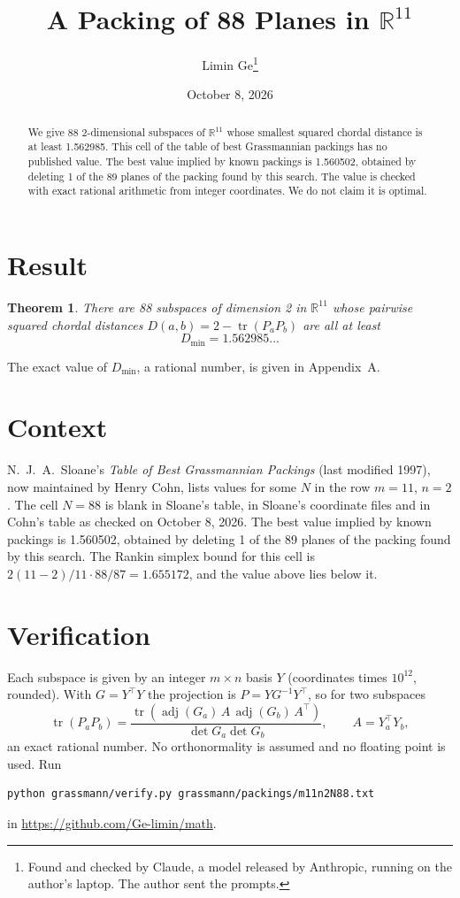\documentclass[11pt,a4paper]{article}
\title{A Packing of 88 Planes in $\mathbb{R}^{11}$}
\author{Limin Ge\thanks{Found and checked by Claude, a model released by Anthropic, running on the author's laptop. The author sent the prompts.}}
\date{October 8, 2026}
\newtheorem*{theorem}{Theorem}
\begin{document}
\maketitle
\begin{abstract}
We give 88 2-dimensional subspaces of $\mathbb{R}^{11}$ whose smallest squared chordal distance is at least 1.562985. This cell of the table of best Grassmannian packings has no published value. The best value implied by known packings is 1.560502, obtained by deleting 1 of the 89 planes of the packing found by this search. The value is checked with exact rational arithmetic from integer coordinates. We do not claim it is optimal.
\end{abstract}

\section{Result}
\begin{theorem}
There are 88 subspaces of dimension 2 in $\mathbb{R}^{11}$ whose pairwise squared chordal distances $D(a,b) = 2 - \operatorname{tr}(P_aP_b)$ are all at least
\[ D_{\min} = 1.562985\ldots \]
\end{theorem}
The exact value of $D_{\min}$, a rational number, is given in Appendix~A.


\section{Context}
N.~J.~A.~Sloane's \emph{Table of Best Grassmannian Packings} (last modified 1997), now maintained by Henry Cohn, lists values for some $N$ in the row $m=11$, $n=2$. The cell $N=88$ is blank in Sloane's table, in Sloane's coordinate files and in Cohn's table as checked on October 8, 2026. The best value implied by known packings is 1.560502, obtained by deleting 1 of the 89 planes of the packing found by this search. The Rankin simplex bound for this cell is $2(11-2)/11\cdot 88/87 = 1.655172$, and the value above lies below it.


\section{Verification}
Each subspace is given by an integer $m\times n$ basis $Y$ (coordinates times $10^{12}$, rounded). With $G=Y^\top Y$ the projection is $P=YG^{-1}Y^\top$, so for two subspaces
\[ \operatorname{tr}(P_aP_b)=\frac{\operatorname{tr}(\operatorname{adj}(G_a)\,A\,\operatorname{adj}(G_b)\,A^\top)}{\det G_a\det G_b},\qquad A=Y_a^\top Y_b, \]
an exact rational number. No orthonormality is assumed and no floating point is used. Run
\begin{verbatim}
python grassmann/verify.py grassmann/packings/m11n2N88.txt
\end{verbatim}
in \url{https://github.com/Ge-limin/math}.
\end{document}
